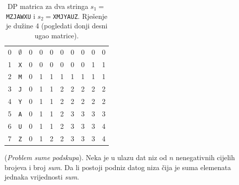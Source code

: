 \begin{solution}
\begin{table}
\begin{tabular}{cc|cccccccc}
     	  	0&$\emptyset$ &0& 0& 0&  0&0 &0 & 0   & 0 	   \\
     	  	1& \texttt{X}& 0& 0& 0& 0& 0& 0&  1  & 1                \\	
     	  	2& \texttt{M}& 0& 1& 1& 1& 1& 1&  1  & 1                \\	
     	  	3& \texttt{J}& 0& 1& 1& 2& 2& 2&  2  & 2                \\	
     	  	4& \texttt{Y}&0 & 1& 1& 2& 2& 2&  2  & 2                 \\	
      	  	5& \texttt{A}& 0& 1& 1& 2& 3& 3&  3  & 3                \\	
      	  	6& \texttt{U}& 0& 1& 1& 2& 3& 3&  3  & 4                \\	
      	  	7& \texttt{Z}& 0& 1& 2& 2& 3& 3&  3  & 4                \\	 \hline \hline
     	  \end{tabular}
 	 \caption{DP matrica za dva stringa $s_1=$\texttt{MZJAWXU} i $s_2=$\texttt{XMJYAUZ}. Rješenje je dužine 4 (pogledati donji desni ugao matrice). }  \label{tab:dp-lcs-example} 
 	\end{table}
\end{solution}


\begin{example}
	({\textit{Problem sume podskupa}}). Neka je u ulazu dat  niz od $n$ nenegativnih cijelih brojeva i broj \textit{sum}. 	Da li postoji podniz datog niza  čija je suma elemenata
	  jednaka vrijednosti  \textit{sum}.
\end{example}

